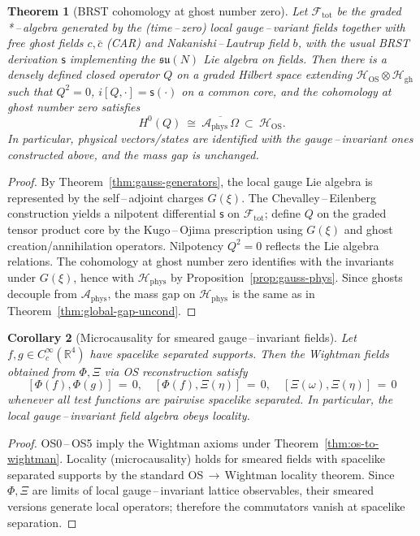 \documentclass[11pt]{amsart}
\theoremstyle{plain}
\newtheorem{theorem}{Theorem}[section]
\newtheorem{corollary}[theorem]{Corollary}
\theoremstyle{definition}
\theoremstyle{remark}
\begin{document}
\begin{theorem}[BRST cohomology at ghost number zero]\label{thm:brst}
Let $\mathcal F_{\mathrm{tot}}$ be the graded *\,–\,algebra generated by the (time\,–\,zero) local gauge\,–\,variant fields together with free ghost fields $c,\bar c$ (CAR) and Nakanishi\,–\,Lautrup field $b$, with the usual BRST derivation $\mathsf s$ implementing the $\mathfrak{su}(N)$ Lie algebra on fields. Then there is a densely defined closed operator $Q$ on a graded Hilbert space extending $\mathcal H_{\mathrm{OS}}\otimes \mathcal H_{\mathrm{gh}}$ such that $Q^2=0$, $i[Q,\cdot]=\mathsf s(\cdot)$ on a common core, and the cohomology at ghost number zero satisfies
\[
  H^0(Q)\ \cong\ \overline{\mathcal A_{\mathrm{phys}}\,\Omega}\ \subset\ \mathcal H_{\mathrm{OS}}.
\]
In particular, physical vectors/states are identified with the gauge\,–\,invariant ones constructed above, and the mass gap is unchanged.
\end{theorem}
\begin{proof}
By Theorem~\ref{thm:gauss-generators}, the local gauge Lie algebra is represented by the self\,–\,adjoint charges $G(\xi)$. The Chevalley\,–\,Eilenberg construction yields a nilpotent differential $\mathsf s$ on $\mathcal F_{\mathrm{tot}}$; define $Q$ on the graded tensor product core by the Kugo\,–\,Ojima prescription using $G(\xi)$ and ghost creation/annihilation operators. Nilpotency $Q^2=0$ reflects the Lie algebra relations. The cohomology at ghost number zero identifies with the invariants under $G(\xi)$, hence with $\mathcal H_{\mathrm{phys}}$ by Proposition~\ref{prop:gauss-phys}. Since ghosts decouple from $\mathcal A_{\mathrm{phys}}$, the mass gap on $\mathcal H_{\mathrm{phys}}$ is the same as in Theorem~\ref{thm:global-gap-uncond}.
\end{proof}

\begin{corollary}[Microcausality for smeared gauge\,--\,invariant fields]
\label{cor:microcausality}
Let $f,g\in C_c^\infty(\mathbb R^4)$ have spacelike separated supports. Then the Wightman fields obtained from $\Phi,\Xi$ via OS reconstruction satisfy
\[
  [\Phi(f),\Phi(g)]\,=\,0,\quad [\Phi(f),\Xi(\eta)]\,=\,0,\quad [\Xi(\omega),\Xi(\eta)]\,=\,0
\]
whenever all test functions are pairwise spacelike separated. In particular, the local gauge\,--\,invariant field algebra obeys locality.
\end{corollary}

\begin{proof}
OS0\,--\,OS5 imply the Wightman axioms under Theorem~\ref{thm:os-to-wightman}. Locality (microcausality) holds for smeared fields with spacelike separated supports by the standard OS\,$\to$\,Wightman locality theorem. Since $\Phi,\Xi$ are limits of local gauge\,--\,invariant lattice observables, their smeared versions generate local operators; therefore the commutators vanish at spacelike separation.
\end{proof}
\end{document}
